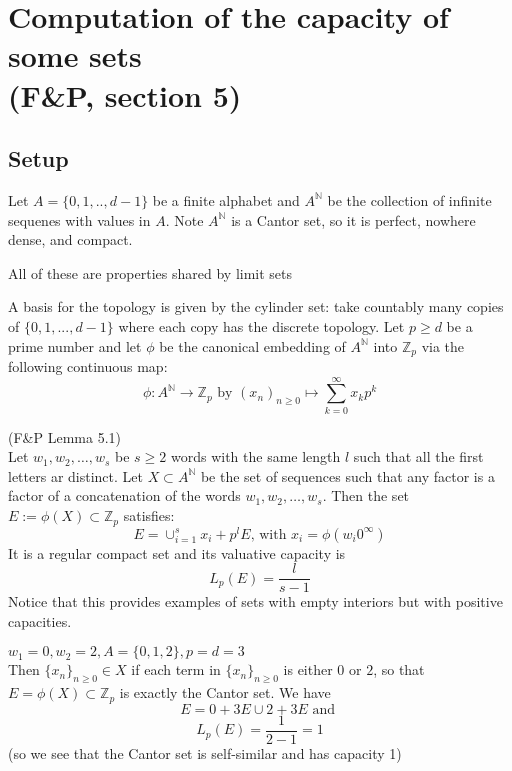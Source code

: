 \section{Computation of the capacity of some sets\\ (F\&P, section 5)}
\subsection*{Setup}
Let $A=\{0,1,..,d-1\}$ be a finite alphabet and $A^{\mathbb{N}}$ be the collection of infinite sequenes with values in $A$. Note $A^{\mathbb{N}}$ is a Cantor set, so it is perfect, nowhere dense, and compact.  \\

\begin{framed}All of these are properties shared by limit sets \end{framed}

A basis for the topology is given by the cylinder set: take countably many copies of $\{0,1,...,d-1\}$ where each copy has the discrete topology. Let $p \geq d$ be a prime number and let $\phi$ be the canonical embedding of $A^\mathbb{N}$ into $\mathbb{Z}_p$ via the following continuous map: \[ \phi: A^{\mathbb{N}} \rightarrow \mathbb{Z}_p \text{ by } (x_n)_{n\geq0} \mapsto \sum_{k=0}^\infty x_kp^k\]

\begin{lemma*} (F\&P Lemma 5.1)\\ Let $w_1,w_2,\ldots,w_s$ be $s\geq 2$ words with the same length $l$ such that all the first letters ar distinct. Let $X \subset A^{\mathbb{N}}$ be the set of sequences such that any factor is a factor of a concatenation of the words $w_1,w_2,\ldots,w_s$. Then the set $E := \phi(X) \subset \mathbb{Z}_p$ satisfies: \[E=\cup_{i=1}^s x_i +p^l E \text{,   with } x_i=\phi(w_i0^\infty)\]
It is a regular compact set and its valuative capacity is \[L_p(E) = \frac{l}{s-1}\] Notice that this provides examples of sets with empty interiors but with positive capacities.
\end{lemma*}
\newpage
\begin{example}
$w_1=0, w_2=2,  A=\{0,1,2\}, p=d=3$\\
Then $\{x_n\}_{n\geq0} \in X$ if each term in  $\{x_n\}_{n\geq0}$ is either $0$ or $2$, so that\\  $E = \phi(X) \subset \mathbb{Z}_p$ is exactly the Cantor set. We have \[E=0 + 3E \cup 2 + 3E \text{ and }\]  \[L_p(E) = \frac{1}{2-1} =1\] 
(so we see that the Cantor set is self-similar and has capacity 1)
\end{example}

